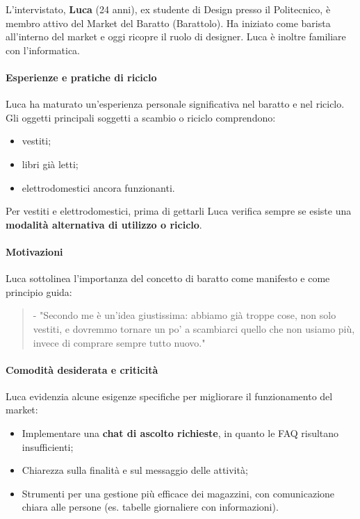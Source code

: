 \documentclass[12pt,a4paper]{article}
\begin{document}
L’intervistato, \textbf{Luca} (24 anni), ex studente di Design presso il Politecnico, è membro attivo del Market del Baratto (Barattolo). Ha iniziato come barista all’interno del market e oggi ricopre il ruolo di designer. Luca è inoltre familiare con l’informatica.  

\paragraph{Esperienze e pratiche di riciclo}

Luca ha maturato un’esperienza personale significativa nel baratto e nel riciclo. Gli oggetti principali soggetti a scambio o riciclo comprendono:
\begin{itemize}
  \item vestiti;
  \item libri già letti;
  \item elettrodomestici ancora funzionanti.
\end{itemize}
Per vestiti e elettrodomestici, prima di gettarli Luca verifica sempre se esiste una \textbf{modalità alternativa di utilizzo o riciclo}.  

\paragraph{Motivazioni}

Luca sottolinea l’importanza del concetto di baratto come manifesto e come principio guida:  

\begin{quote}
- "Secondo me è un’idea giustissima: abbiamo già troppe cose, non solo vestiti, e dovremmo tornare un po’ a scambiarci quello che non usiamo più, invece di comprare sempre tutto nuovo."
\end{quote}

\paragraph{Comodità desiderata e criticità}

Luca evidenzia alcune esigenze specifiche per migliorare il funzionamento del market:
\begin{itemize}
  \item Implementare una \textbf{chat di ascolto richieste}, in quanto le FAQ risultano insufficienti;  
  \item Chiarezza sulla finalità e sul messaggio delle attività;  
  \item Strumenti per una gestione più efficace dei magazzini, con comunicazione chiara alle persone (es. tabelle giornaliere con informazioni).  
\end{itemize}
\end{document}

